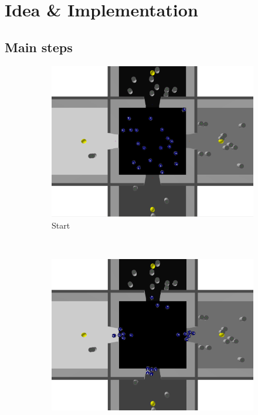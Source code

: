\section{Idea \& Implementation}

\subsection{Main steps}

\begin{figure}[h!]
        \centering
        \begin{subfigure}[b]{0.5\textwidth}
            \includegraphics[width=\textwidth]{images/1_start.png}
            \caption{Start}
        \end{subfigure}%
        ~
        \begin{subfigure}[b]{0.5\textwidth}
            \includegraphics[width=\textwidth]{images/2_split.png}

\end{subfigure}
\end{figure}
